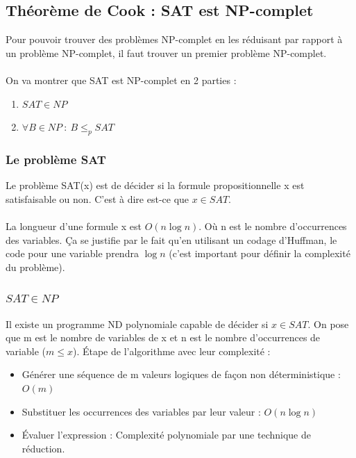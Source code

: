 \subsection{Théorème de Cook : SAT est NP-complet}
Pour pouvoir trouver des problèmes NP-complet en les réduisant par rapport à
un problème NP-complet, il faut trouver un premier problème NP-complet. 
\paragraph{} On va montrer que SAT est NP-complet en 2 parties :
\begin{enumerate}
	\item $SAT \in NP$
	\item $\forall B \in NP \ : \  B\leq_p SAT $
\end{enumerate}

\subsubsection{Le problème SAT}
Le problème SAT(x) est de décider si la formule propositionnelle x est 
satisfaisable ou non. C'est à dire est-ce que $x\in SAT$.

\paragraph{} La longueur d'une formule x est $O(n\log n)$. Où n est le nombre
d'occurrences des variables. Ça se justifie par le fait qu'en utilisant un codage
d'Huffman, le code pour une variable prendra $\log n$ (c'est important pour
définir la complexité du problème).

\subsubsection{$SAT \in NP$}
Il existe un programme ND polynomiale capable de décider si $x\in SAT$. On pose
que m est le nombre de variables de x et n est le nombre d'occurrences de
variable ($m\leq x$). Étape de l'algorithme avec leur complexité :
\begin{itemize}
	\item  Générer une séquence de m valeurs logiques de façon
		non déterministique : $O(m)$
	\item  Substituer les occurrences des variables par leur valeur : $O(n
		\log n)$ 
	\item Évaluer l'expression : Complexité polynomiale par une technique
		de réduction.
\end{itemize}

